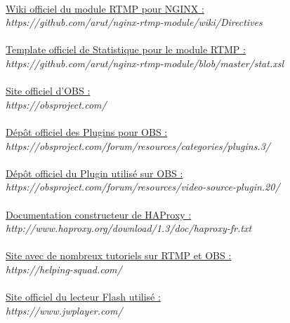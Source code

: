 \documentclass{report}
\begin{document}
\begin{tabbing}
    \\

    \underline{Wiki officiel du module RTMP pour NGINX :}\\
    \textit{https://github.com/arut/nginx-rtmp-module/wiki/Directives}\\
    
    \\
    

    \underline{Template officiel de Statistique pour le module RTMP :}\\
    \textit{https://github.com/arut/nginx-rtmp-module/blob/master/stat.xsl}\\
    
    \\
    
    \underline{Site officiel d'OBS :}\\
    \textit{https://obsproject.com/}\\
    
    \\

    \underline{Dépôt officiel des Plugins pour OBS :}\\
    \textit{https://obsproject.com/forum/resources/categories/plugins.3/}\\
    
    \\

    \underline{Dépôt officiel du Plugin utilisé sur OBS :}\\
    \textit{https://obsproject.com/forum/resources/video-source-plugin.20/}\\
    
    \\

    \underline{Documentation constructeur de HAProxy :}\\
    \textit{http://www.haproxy.org/download/1.3/doc/haproxy-fr.txt}\\
    
    \\

    \underline{Site avec de nombreux tutoriels sur RTMP et OBS :}\\
    \textit{https://helping-squad.com/}\\
    
    \\
      
    \underline{Site officiel du lecteur Flash utilisé :}\\
    \textit{https://www.jwplayer.com/}\\
    

\end{tabbing}
\end{document}
